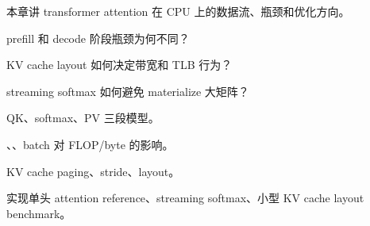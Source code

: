 {本章讲 transformer attention 在 CPU 上的数据流、瓶颈和优化方向。}
{\item prefill 和 decode 阶段瓶颈为何不同？
\item KV cache layout 如何决定带宽和 TLB 行为？
\item streaming softmax 如何避免 materialize 大矩阵？}
{\item QK、softmax、PV 三段模型。
\item {}、、batch 对 FLOP/byte 的影响。
\item KV cache paging、stride、layout。}
{实现单头 attention reference、streaming softmax、小型 KV cache layout benchmark。}
